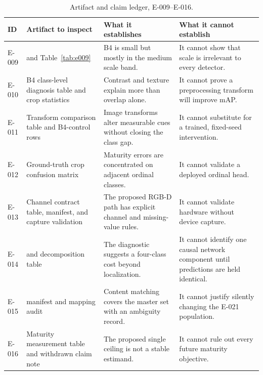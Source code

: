 \begin{table}[t]
\centering\small
\caption{Artifact and claim ledger, E-009--E-016.}
\begin{tabularx}{\textwidth}{L{0.07\textwidth}L{0.29\textwidth}Y Y}
\toprule
\textbf{ID} & \textbf{Artifact to inspect} & \textbf{What it establishes} & \textbf{What it cannot establish}\\
\midrule
E-009 &  and Table~\ref{tab:e009} & B4 is small but mostly in the medium scale band. & It cannot show that scale is irrelevant to every detector.\\
E-010 & B4 class-level diagnosis table and crop statistics & Contrast and texture explain more than overlap alone. & It cannot prove a preprocessing transform will improve mAP.\\
E-011 & Transform comparison table and B4-control rows & Image transforms alter measurable cues without closing the class gap. & It cannot substitute for a trained, fixed-seed intervention.\\
E-012 & Ground-truth crop confusion matrix & Maturity errors are concentrated on adjacent ordinal classes. & It cannot validate a deployed ordinal head.\\
E-013 & Channel contract table, manifest, and capture validation & The proposed RGB-D path has explicit channel and missing-value rules. & It cannot validate hardware without device capture.\\
E-014 &  and decomposition table & The diagnostic suggests a four-class cost beyond localization. & It cannot identify one causal network component until predictions are held identical.\\
E-015 &  manifest and mapping audit & Content matching covers the master set with an ambiguity record. & It cannot justify silently changing the E-021 population.\\
E-016 & Maturity measurement table and withdrawn claim note & The proposed single ceiling is not a stable estimand. & It cannot rule out every future maturity objective.\\
\bottomrule
\end{tabularx}
\end{table}

